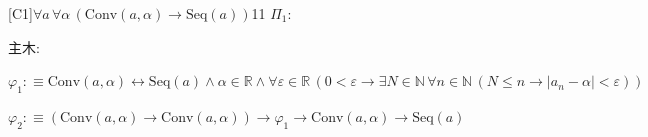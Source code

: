 \begin{fullproof}{[C1]}{$\forall a\,\forall \alpha\,(\mathrm{Conv}(a,\alpha) \to \mathrm{Seq}(a))$}{11}\label{tree:ConvSeq}
\noindent$\Pi_{1}$:
\begin{ptree}
\end{ptree}
\noindent 主木:
\begin{ptree}
\noLine
{}
\end{ptree}
\begin{abbrevlist}
\item $\varphi_{1} :\equiv \mathrm{Conv}(a,\alpha) \leftrightarrow \mathrm{Seq}(a) \land \alpha \in \mathbb{R} \land \forall \varepsilon \in \mathbb{R}\,(0 < \varepsilon \to \exists N \in \mathbb{N}\,\forall n \in \mathbb{N}\,(N \leq n \to \lvert a_{n} - \alpha \rvert < \varepsilon))$
\item $\varphi_{2} :\equiv (\mathrm{Conv}(a,\alpha) \to \mathrm{Conv}(a,\alpha)) \to \varphi_{1} \to \mathrm{Conv}(a,\alpha) \to \mathrm{Seq}(a)$
\end{abbrevlist}
\end{fullproof}
